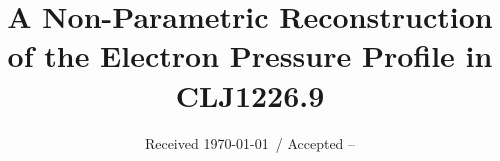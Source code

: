 \documentclass[twocolumn,traditabstract]{aa}
\begin{document}
\title{A Non-Parametric Reconstruction of the Electron Pressure Profile in CLJ1226.9}

\date{Received \today \ / Accepted --}




\end{document}
